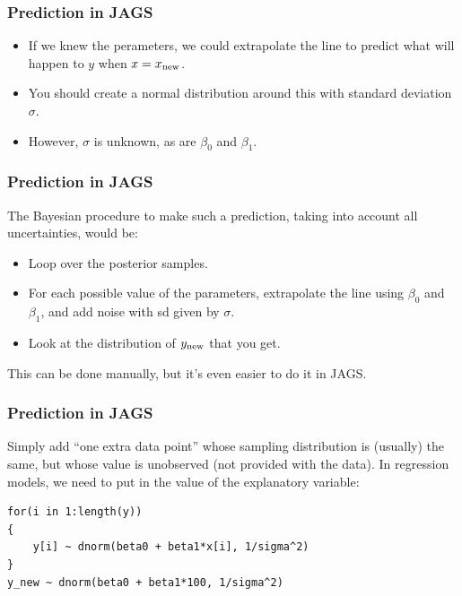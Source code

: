 \documentclass{beamer}
\begin{document}
\begin{frame}
\frametitle{Prediction in JAGS}
\begin{itemize}
\item If we knew the perameters, we could extrapolate the line to predict
what will happen to $y$ when $x=x_{\rm new}$.\pause
\item You should create a normal distribution around this with standard deviation
$\sigma$.\pause
\item However, $\sigma$ is unknown, as are $\beta_0$ and $\beta_1$.
\end{itemize}
\end{frame}


\begin{frame}
\frametitle{Prediction in JAGS}
The Bayesian procedure to make such a prediction, taking into account all
uncertainties, would be:
\begin{itemize}
\item Loop over the posterior samples.\pause
\item For each possible value of the parameters,
extrapolate the line using $\beta_0$ and $\beta_1$, and add noise with sd
given by $\sigma$.\pause
\item Look at the distribution of $y_{\rm new}$ that you get.\pause
\end{itemize}
This can be done manually, but it's even easier to do it in JAGS.

\end{frame}



\begin{frame}[fragile]
\frametitle{Prediction in JAGS}
Simply add ``one extra data point'' whose sampling distribution is (usually)
the same, but whose value is unobserved (not provided with the data).
In regression models, we need to put in the value of the explanatory variable:
\begin{verbatim}
for(i in 1:length(y))
{
    y[i] ~ dnorm(beta0 + beta1*x[i], 1/sigma^2)
}
y_new ~ dnorm(beta0 + beta1*100, 1/sigma^2)
\end{verbatim}
\end{frame}
\end{document}
